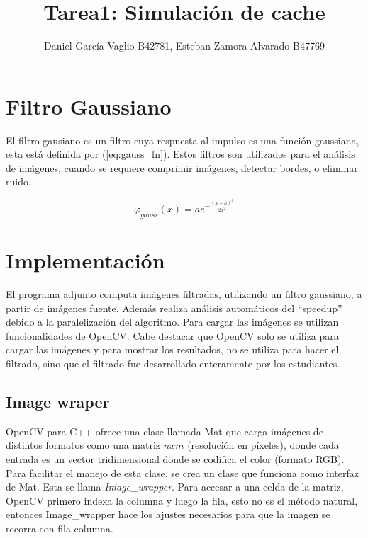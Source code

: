 \documentclass {article}
\begin{document}
\title{Tarea1: Simulación de cache}
\author{Daniel García Vaglio B42781, Esteban Zamora Alvarado B47769}

\maketitle


\section{Filtro Gaussiano}

El filtro gausiano es un filtro cuya respuesta al impulso es una función gaussiana, esta está
definida por (\ref{eq:gauss_fn}). Estos filtros son utilizados para el análisis de imágenes, cuando
se requiere comprimir imágenes, detectar bordes, o eliminar ruido. 

\begin{equation}
  \varphi_{gauss}(x)=ae^{-\frac{(x-n)^2}{2x^2}}
\label{eq:gauss_fn}
\end{equation}



\section{Implementación}

El programa adjunto computa imágenes filtradas, utilizando un filtro gaussiano, a partir de imágenes
fuente. Además realiza análisis automáticos del ``speedup'' debido a la paralelización del
algoritmo. Para cargar las imágenes se utilizan funcionalidades de OpenCV. Cabe destacar que OpenCV
solo se utiliza para cargar las imágenes y para mostrar los resultados, no se utiliza para hacer el
filtrado, sino que el filtrado fue desarrollado enteramente por los estudiantes.

\subsection{Image wraper}
OpenCV para C++ ofrece una clase llamada Mat que carga imágenes de distintos formatos como una
matriz $nxm$ (resolución en píxeles), donde cada entrada es un vector tridimensional donde se
codifica el color (formato RGB). Para facilitar el manejo de esta clase, se crea un clase que
funciona como interfaz de Mat. Esta se llama \textit{Image\_wrapper}. Para accesar a una celda de la
matriz, OpenCV primero indexa la columna y luego la fila, esto no es el método natural, entonces
Image\_wrapper hace los ajustes necesarios para que la imagen se recorra con fila columna.
\end{document}
